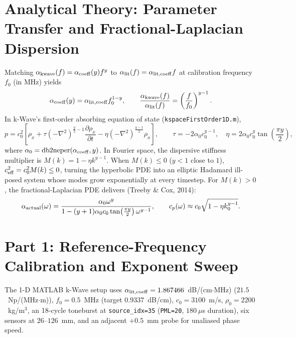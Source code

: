 \documentclass[11pt]{article}
\begin{document}
\section{Analytical Theory: Parameter Transfer and Fractional-Laplacian Dispersion}
Matching $\alpha_{\rm kwave}(f)=\alpha_{\rm coeff}(y)f^y$ to $\alpha_{\rm lit}(f)=\alpha_{\rm lit,coeff}f$ at calibration frequency $f_0$ (in MHz) yields
\[
\alpha_{\rm coeff}(y)=\alpha_{\rm lit,coeff}f_0^{1-y},\qquad
\frac{\alpha_{\rm kwave}(f)}{\alpha_{\rm lit}(f)}=\left(\frac{f}{f_0}\right)^{y-1}.
\]
In k-Wave's first-order absorbing equation of state (\texttt{kspaceFirstOrder1D.m}),
\[
p = c_0^2 \left[\rho_x + \tau (-\nabla^2)^{\frac{y}{2}-1}\frac{\partial \rho_x}{\partial t} - \eta (-\nabla^2)^{\frac{y-1}{2}}\rho_x\right],
\qquad
\tau = -2\alpha_0 c_0^{y-1},\quad
\eta = 2\alpha_0 c_0^y \tan\!\left(\frac{\pi y}{2}\right),
\]
where $\alpha_0 = \mathrm{db2neper}(\alpha_{\rm coeff},y)$. In Fourier space, the dispersive stiffness multiplier is $M(k) = 1 - \eta k^{y-1}$. When $M(k) \le 0$ ($y < 1$ close to $1$), $c_{\rm eff}^2 = c_0^2 M(k) \le 0$, turning the hyperbolic PDE into an elliptic Hadamard ill-posed system whose modes grow exponentially at every timestep. For $M(k) > 0$, the fractional-Laplacian PDE delivers (Treeby \& Cox, 2014):
\[
\alpha_{\rm actual}(\omega) = \frac{\alpha_0 \omega^y}{1 - (y+1)\alpha_0 c_0 \tan\!\left(\frac{\pi y}{2}\right)\omega^{y-1}},
\qquad
c_p(\omega) \approx c_0 \sqrt{1 - \eta k_0^{y-1}}.
\]

\section{Part 1: Reference-Frequency Calibration and Exponent Sweep}
The 1-D MATLAB k-Wave setup uses $\alpha_{\rm lit,coeff}=1.867466$~dB/(cm$\cdot$MHz) ($21.5$~Np/(MHz$\cdot$m)), $f_0=0.5$~MHz (target $0.9337$~dB/cm), $c_0=3100$~m/s, $\rho_0=2200$~kg/m$^3$, an 18-cycle toneburst at \texttt{source\_idx=35} (\texttt{PML=20}, $180~\mu$s duration), six sensors at $26$--$126$~mm, and an adjacent $+0.5$~mm probe for unaliased phase speed.
\end{document}
